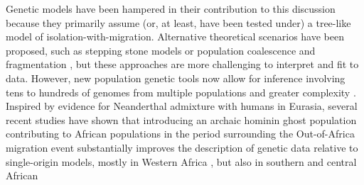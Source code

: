 \documentclass[]{article}
\begin{document}
Genetic models have been hampered in their contribution to this discussion
because they primarily assume (or, at least, have been tested under) a
tree-like model of isolation-with-migration. Alternative theoretical scenarios
have been proposed, such as stepping stone models \citep{Arredondo2021-qa} or
population coalescence and fragmentation \citep{Scerri2019-xg}, but these
approaches are more challenging to interpret and fit to data.
However, new population genetic tools now allow for inference involving tens to
hundreds of genomes from multiple populations and greater complexity
\citep{Kamm2020-vn,Ragsdale2019-nt,Speidel2019-nj}. Inspired by evidence for
Neanderthal admixture with humans in Eurasia, several recent studies
have shown that introducing an archaic hominin ghost population contributing to 
African populations in the period surrounding the Out-of-Africa migration event
substantially improves the description of genetic data relative to
single-origin models, mostly in Western Africa
\citep{Plagnol2006-lt,Hammer2011-bx,Hey2018-pw,Ragsdale2019-nt,
Lorente-Galdos2019-vz,Durvasula2020-td},
%
%
%
%
%
but also in southern \cite{Hammer2011-bx,Lorente-Galdos2019-vz} 
and central African \cite{Hsieh2016-gk, Hammer2011-bx,Lorente-Galdos2019-vz,Hey2018-pw}
\end{document}
